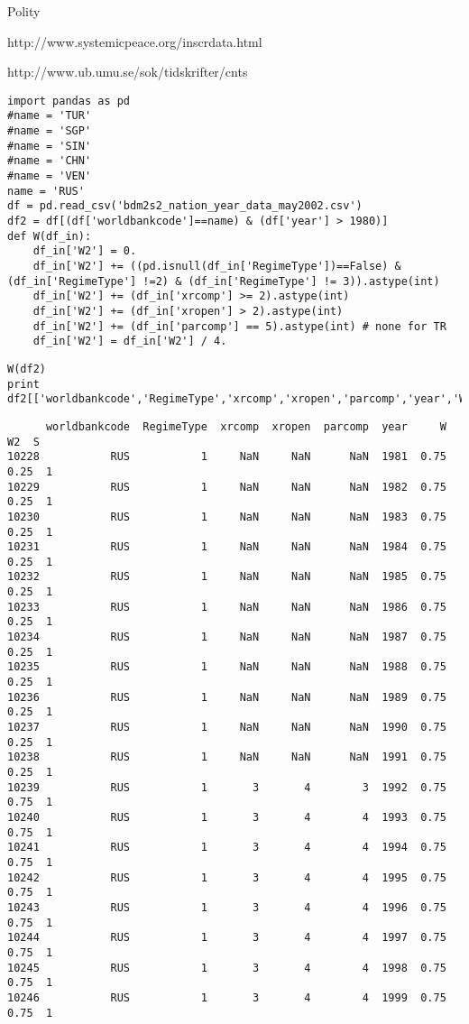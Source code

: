 \documentclass[12pt,fleqn]{article}\usepackage{common}
\begin{document}
Polity

http://www.systemicpeace.org/inscrdata.html

http://www.ub.umu.se/sok/tidskrifter/cnts

\begin{verbatim}
import pandas as pd
#name = 'TUR'
#name = 'SGP'
#name = 'SIN'
#name = 'CHN'
#name = 'VEN'
name = 'RUS'
df = pd.read_csv('bdm2s2_nation_year_data_may2002.csv')
df2 = df[(df['worldbankcode']==name) & (df['year'] > 1980)]
def W(df_in):
    df_in['W2'] = 0.
    df_in['W2'] += ((pd.isnull(df_in['RegimeType'])==False) & (df_in['RegimeType'] !=2) & (df_in['RegimeType'] != 3)).astype(int)
    df_in['W2'] += (df_in['xrcomp'] >= 2).astype(int)
    df_in['W2'] += (df_in['xropen'] > 2).astype(int)
    df_in['W2'] += (df_in['parcomp'] == 5).astype(int) # none for TR
    df_in['W2'] = df_in['W2'] / 4.
\end{verbatim}

\begin{verbatim}
W(df2)
print df2[['worldbankcode','RegimeType','xrcomp','xropen','parcomp','year','W','W2','S']]
\end{verbatim}

\begin{verbatim}
      worldbankcode  RegimeType  xrcomp  xropen  parcomp  year     W    W2  S
10228           RUS           1     NaN     NaN      NaN  1981  0.75  0.25  1
10229           RUS           1     NaN     NaN      NaN  1982  0.75  0.25  1
10230           RUS           1     NaN     NaN      NaN  1983  0.75  0.25  1
10231           RUS           1     NaN     NaN      NaN  1984  0.75  0.25  1
10232           RUS           1     NaN     NaN      NaN  1985  0.75  0.25  1
10233           RUS           1     NaN     NaN      NaN  1986  0.75  0.25  1
10234           RUS           1     NaN     NaN      NaN  1987  0.75  0.25  1
10235           RUS           1     NaN     NaN      NaN  1988  0.75  0.25  1
10236           RUS           1     NaN     NaN      NaN  1989  0.75  0.25  1
10237           RUS           1     NaN     NaN      NaN  1990  0.75  0.25  1
10238           RUS           1     NaN     NaN      NaN  1991  0.75  0.25  1
10239           RUS           1       3       4        3  1992  0.75  0.75  1
10240           RUS           1       3       4        4  1993  0.75  0.75  1
10241           RUS           1       3       4        4  1994  0.75  0.75  1
10242           RUS           1       3       4        4  1995  0.75  0.75  1
10243           RUS           1       3       4        4  1996  0.75  0.75  1
10244           RUS           1       3       4        4  1997  0.75  0.75  1
10245           RUS           1       3       4        4  1998  0.75  0.75  1
10246           RUS           1       3       4        4  1999  0.75  0.75  1
\end{verbatim}
\end{document}
